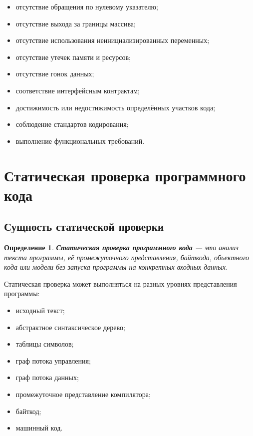 \documentclass[12pt,a4paper]{article}
\newtheorem{definition}{Определение}
\begin{document}
\begin{itemize}
  \item отсутствие обращения по нулевому указателю;
  \item отсутствие выхода за границы массива;
  \item отсутствие использования неинициализированных переменных;
  \item отсутствие утечек памяти и ресурсов;
  \item отсутствие гонок данных;
  \item соответствие интерфейсным контрактам;
  \item достижимость или недостижимость определённых участков кода;
  \item соблюдение стандартов кодирования;
  \item выполнение функциональных требований.
\end{itemize}

\section{Статическая проверка программного кода}

\subsection{Сущность статической проверки}

\begin{definition}
\textbf{Статическая проверка программного кода} --- это анализ текста программы, её промежуточного представления, байткода, объектного кода или модели без запуска программы на конкретных входных данных.
\end{definition}

Статическая проверка может выполняться на разных уровнях представления программы:

\begin{itemize}
  \item исходный текст;
  \item абстрактное синтаксическое дерево;
  \item таблицы символов;
  \item граф потока управления;
  \item граф потока данных;
  \item промежуточное представление компилятора;
  \item байткод;
  \item машинный код.
\end{itemize}
\end{document}
